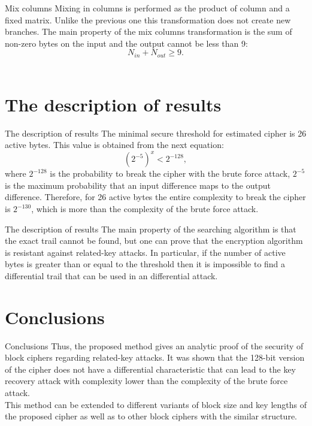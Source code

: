 \documentclass[10pt]{beamer}
\begin{document}
\begin{frame}{Mix columns}
Mixing in columns is performed as the product of column and a fixed matrix. Unlike the previous one this transformation does not create new branches. The main property of the mix columns transformation is the sum of non-zero bytes on the input and the output cannot be less than 9:
$$N_{in} + N_{out} \ge 9.$$
\\
\end{frame}

\section{The description of results}

\begin{frame}{The description of results}
The minimal secure threshold for estimated cipher is 26 active bytes. This value is obtained from the next equation:
$$(2^{-5})^x < 2^{-128},$$
where $2^{-128}$ is the probability to break the cipher with the brute force attack, $2^{-5}$ is the maximum probability that an input difference maps to the output difference. Therefore, for 26 active bytes the entire complexity to break the cipher is $2^{-130}$, which is more than the complexity of the brute force attack.
\end{frame}

\begin{frame}{The description of results}
The main property of the searching algorithm is that the exact trail cannot be found, but one can prove that the encryption algorithm is resistant against related-key attacks. \pause In particular, if the number of active bytes is greater than or equal to the threshold then it is impossible to find a differential trail that can be used in an differential attack.
\end{frame}

\section{Conclusions}

\begin{frame}{Conclusions}
Thus, the proposed method gives an analytic proof of the security of block ciphers regarding related-key attacks. It was shown that the 128-bit version of the cipher does not have a differential characteristic that can lead to the key recovery attack with complexity lower than the complexity of the brute force attack. \pause \\
This method can be extended to different variants of block size and key lengths of the proposed cipher as well as to other block ciphers with the similar structure.
\end{frame}
\end{document}
